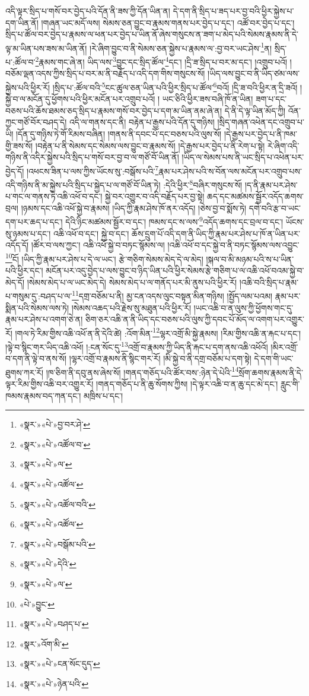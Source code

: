འདི་ལྟར་སྲིད་པ་གསོ་བར་བྱེད་པའི་དོན་ནི་ཟས་ཀྱི་དོན་ཡིན་ན། དེ་དག་ནི་སྲིད་པ་ཟད་པར་བྱ་བའི་ཕྱིར་སྐྱེས་པ་དག་ཡིན་ནོ། །གཞན་ཡང་མདོ་ལས། སེམས་ཅན་བྱུང་བ་རྣམས་གནས་པར་བྱེད་པ་དང་། འཚོ་བར་བྱེད་པ་དང་། སྲིད་པ་ཚོལ་བར་བྱེད་པ་རྣམས་ལ་ཕན་པར་བྱེད་པ་ཡིན་ནོ་ཞེས་གསུངས་ན་ཟག་པ་མེད་པའི་སེམས་རྣམས་ནི་དེ་ལྟ་མ་ཡིན་པས་ཟས་མ་ཡིན་ནོ། །རེ་ཞིག་བྱུང་བ་ནི་སེམས་ཅན་སྐྱེས་པ་རྣམས་ལ་:བྱ་བར་ཡང་ཤེས་\footnote{«སྣར་»«པེ་»བྱ་བར་ཤེ་}ན། སྲིད་པ་:ཚོལ་བ་\footnote{«སྣར་»«པེ་»འཚོལ་བ་}རྣམས་གང་ཞེ་ན། ཡིད་ལས་\footnote{«སྣར་»«པེ་»ལ་}བྱུང་དང་སྲིད་ཚོལ་\footnote{«སྣར་»«པེ་»འཚོལ་}དང་། །དྲི་ཟ་སྲིད་པ་བར་མ་དང་། །འགྲུབ་པའོ། །བཅོམ་ལྡན་འདས་ཀྱིས་སྲིད་པ་བར་མ་ནི་བརྗོད་པ་འདི་དག་གིས་གསུངས་སོ། །ཡིད་ལས་བྱུང་བ་ནི་ཡིད་ཙམ་ལས་སྐྱེས་པའི་ཕྱིར་རོ། །སྲིད་པ་:ཚོལ་བའི་\footnote{«སྣར་»«པེ་»འཚོལ་བའི་}ངང་ཚུལ་ཅན་ཡིན་པའི་ཕྱིར་སྲིད་པ་ཚོལ་\footnote{«སྣར་»«པེ་»འཚོལ་}བའོ། །དྲི་ཟ་བའི་ཕྱིར་ན་དྲི་ཟའོ། །སྐྱེ་བ་ལ་མངོན་དུ་ཕྱོགས་པའི་ཕྱིར་མངོན་པར་འགྲུབ་པའོ། །
ཡང་ཅིའི་ཕྱིར་ཟས་བཞི་ཁོ་ན་ཡིན། ཟག་པ་དང་བཅས་པའི་ཆོས་ཐམས་ཅད་སྲིད་པ་རྣམས་གསོ་བར་བྱེད་པ་དག་མ་ཡིན་ནམ་ཞེ་ན། དེ་ནི་དེ་ལྟ་ཡིན་མོད་ཀྱི། འོན་ཀྱང་གཙོ་བོར་བཤད་དེ། འདི་ལ་གནས་དང་ནི། བརྟེན་པ་རྒྱས་པའི་དོན་དུ་གཉིས། །སྲིད་གཞན་འཕེན་དང་འགྲུབ་པ་ཡི། །དོན་དུ་གཉིས་ཏེ་གོ་རིམས་བཞིན། །གནས་ནི་དབང་པོ་དང་བཅས་པའི་ལུས་སོ། །དེ་རྒྱས་པར་བྱེད་པ་ནི་ཁམ་གྱི་ཟས་སོ། །བརྟེན་པ་ནི་སེམས་དང་སེམས་ལས་བྱུང་བ་རྣམས་སོ། །དེ་རྒྱས་པར་བྱེད་པ་ནི་རེག་པ་སྟེ། རེ་ཞིག་འདི་གཉིས་ནི་འདིར་སྐྱེས་པའི་སྲིད་པ་གསོ་བར་བྱ་བ་ལ་གཙོ་བོ་ཡིན་ནོ། །ཡིད་ལ་སེམས་པས་ནི་ཡང་སྲིད་པ་འཕེན་པར་བྱེད་དོ། །འཕངས་ཟིན་པ་ལས་ཀྱིས་ཡོངས་སུ་:བསྒོས་པའི་\footnote{«སྣར་»«པེ་»བསྒོམ་པའི་}རྣམ་པར་ཤེས་པའི་ས་བོན་ལས་མངོན་པར་འགྲུབ་པས་འདི་གཉིས་ནི་མ་སྐྱེས་པའི་སྲིད་པ་སྐྱེད་པ་ལ་གཙོ་བོ་ཡིན་ཏེ། :དེའི་ཕྱིར་\footnote{«སྣར་»«པེ་»དེའི་}བཞིར་གསུངས་སོ། །ད་ནི་རྣམ་པར་ཤེས་པ་གང་ལ་གནས་ཏེ་འཆི་འཕོ་བ་དང་། སྐྱེ་བར་འགྱུར་བ་འདི་བརྗོད་པར་བྱ་སྟེ། ཆད་དང་མཚམས་སྦྱོར་འདོད་ཆགས་བྲལ། །ཉམས་དང་འཆི་འཕོ་སྐྱེ་བ་རྣམས། །ཡིད་ཀྱི་རྣམ་ཤེས་ཁོ་ནར་འདོད། །ཅེས་བྱ་བ་སྨོས་ཏེ། དགེ་བའི་རྩ་བ་ཡང་དག་པར་ཆད་པ་དང་། དེའི་ཉིང་མཚམས་སྦྱོར་བ་དང་། ཁམས་དང་ས་ལས་\footnote{«སྣར་»«པེ་»ལ་}འདོད་ཆགས་དང་བྲལ་བ་དང་། ཡོངས་སུ་ཉམས་པ་དང་། འཆི་འཕོ་བ་དང་། སྐྱེ་བ་དང་། ཆོས་དྲུག་པོ་འདི་དག་ནི་ཡིད་ཀྱི་རྣམ་པར་ཤེས་པ་ཁོ་ན་ཡིན་པར་འདོད་དོ། །ཚོར་བ་ལས་ཀྱང་། འཆི་འཕོ་སྐྱེ་བ་བཏང་སྙོམས་ལ། །འཆི་འཕོ་བ་དང་སྐྱེ་བ་ནི་བཏང་སྙོམས་ལས་འབྱུང་\footnote{«པེ་»བྱུང་}ངོ། །ཡིད་ཀྱི་རྣམ་པར་ཤེས་པ་དེ་ལ་ཡང་། རྩེ་གཅིག་སེམས་མེད་དེ་ལ་མེད། །སྐལ་བ་མི་མཉམ་པའི་ས་པ་ཡིན་པའི་ཕྱིར་དང་། མངོན་པར་འདུ་བྱེད་པ་ལས་བྱུང་བ་ཉིད་ཡིན་པའི་ཕྱིར་སེམས་རྩེ་གཅིག་པ་ལ་འཆི་འཕོ་བའམ་སྐྱེ་བ་མེད་དོ། །སེམས་མེད་པ་ལ་ཡང་མེད་དེ། སེམས་མེད་པ་ལ་གནོད་པར་མི་ནུས་པའི་ཕྱིར་རོ། །འཆི་བའི་སྲིད་པ་རྣམ་པ་གསུམ་དུ་:བཤད་པ་ལ་\footnote{«སྣར་»«པེ་»བཤད་པ་}དགྲ་བཅོམ་པ་ནི། མྱ་ངན་འདས་ལུང་བསྟན་མིན་གཉིས། །སྤྱོད་ལམ་པའམ། རྣམ་པར་སྨིན་པའི་སེམས་ལས་ཏེ། །སེམས་འཆད་པའི་རྗེས་སུ་མཐུན་པའི་ཕྱིར་རོ། །ཡང་འཆི་བ་ན་ལུས་ཀྱི་ཕྱོགས་གང་དུ་རྣམ་པར་ཤེས་པ་འགག་ཅེ་ན། ཅིག་ཅར་འཆི་ན་ནི་ཡིད་དང་བཅས་པའི་ལུས་ཀྱི་དབང་པོ་མོད་ལ་འགག་པར་འགྱུར་རོ། །གལ་ཏེ་རིམ་གྱིས་འཆི་འཕོ་ན་ནི་དེའི་ཚེ། :འོག་མིན་\footnote{«སྣར་»འོག་མི་}ལྷར་འགྲོ་མི་སྐྱེ་རྣམས། །རིམ་གྱིས་འཆི་ན་རྐང་པ་དང་། །ལྟེ་བ་སྙིང་གར་ཡིད་འཆི་འཕོ། །:ངན་སོང་དུ་\footnote{«སྣར་»«པེ་»ངན་སོང་དུད་}འགྲོ་བ་རྣམས་ཀྱི་ཡིད་ནི་རྐང་པ་དག་ནས་འཆི་འཕོའོ། །མིར་འགྲོ་བ་དག་ནི་ལྟེ་བ་ནས་སོ། །ལྷར་འགྲོ་བ་རྣམས་ནི་སྙིང་གར་རོ། །མི་སྐྱེ་བ་ནི་དགྲ་བཅོམ་པ་དག་སྟེ། དེ་དག་གི་ཡང་ཐུགས་ཀར་རོ། །ཁ་ཅིག་ནི་དབུ་ནས་ཞེས་སོ། །གནད་གཅོད་པའི་ཚོར་བས་:ཉེན་དེ་པེའི་\footnote{«སྣར་»«པེ་»ཉེན་པའི་}སྲོག་ཆགས་རྣམས་ནི་དེ་ལྟར་རིམ་གྱིས་འཆི་བར་འགྱུར་རོ། །གནད་གཅོད་པ་ནི་ཆུ་སོགས་ཀྱིས། །དེ་ལྟར་འཆི་བ་ན་ཆུ་དང་མེ་དང་། རླུང་གི་ཁམས་རྣམས་བད་ཀན་དང་། མཁྲིས་པ་དང་། 